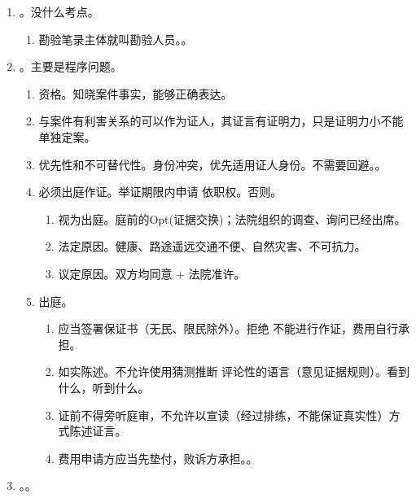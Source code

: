 \begin{enumerate}
\begin{enumerate}
          \item {}。没什么考点。
                \begin{enumerate}
                  \item 勘验笔录主体就叫勘验人员。。
                \end{enumerate}
          \item {}。主要是程序问题。
                \begin{enumerate}
                  \item 资格。知晓案件事实，能够正确表达。
                  \item 与案件有利害关系的可以作为证人，其证言有证明力，只是证明力小不能单独定案。
                  \item 优先性和不可替代性。身份冲突，优先适用证人身份。不需要回避。。
                  \item 必须出庭作证。举证期限内申请 \hz 依职权。否则。
                        \begin{enumerate}
                          \item 视为出庭。庭前的Opt(证据交换)；法院组织的调查、询问已经出席。
                          \item 法定原因。健康、路途遥远交通不便、自然灾害、不可抗力。
                          \item 议定原因。双方均同意 + 法院准许。
                        \end{enumerate}
                  \item 出庭。
                        \begin{enumerate}
                          \item 应当签署保证书（无民、限民除外）。拒绝 \yjt 不能进行作证，费用自行承担。
                          \item 如实陈述。不允许使用猜测推断 \hz 评论性的语言（意见证据规则）。看到什么，听到什么。
                          \item 证前不得旁听庭审，不允许以宣读（经过排练，不能保证真实性）方式陈述证言。
                          \item 费用申请方应当先垫付，败诉方承担。。
                        \end{enumerate}
                \end{enumerate}
          \item {}。。

\end{enumerate}
\end{enumerate}
